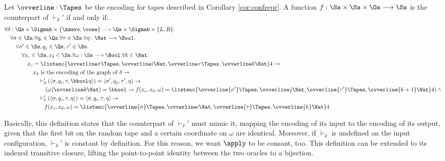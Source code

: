 \begin{conditional}{\notappendix}
  \begin{defn}
    \label{def:vdashcounter}
    Let $\ovverline \cdot \Tapes$ be the encoding for tapes described in
    Corollary \ref{cor:confrepr}.
    A function $f : \Ss\times \Ss \times \Os \longrightarrow \Ss$ is the counterpart
    of $\vdash_\delta'$ if and only if:
    \begin{align*}
      &\forall \delta: \Qs \times \Sigmab \times \{\zzero, \oone\} \longrightarrow \Qs \times \Sigmab \times \{L,R\}. \\
      &\quad\forall \sigma \in \Ss.\forall q_i \in \Qs.\forall\tau \in \Ss.\forall \eta: \Nat\longrightarrow\Bool .\\
      &\quad\quad  \forall \sigma' \in \Ss, q_j\in \Qs,\tau'\in \Ss.\\
      &\quad\quad\quad  \forall x_c \in \Ss, x_\delta \in \Ss.\forall\omega: \Ss\longrightarrow\Bool. \forall k \in \Nat. \\
      &\quad\quad\quad\quad  x_c = \listenc {\ovverline \sigma \Tapes, \ovverline i \Nat, \ovverline \tau \Tapes, \ovverline k \Nat} 4 \to\\
      &\quad\quad\quad\quad\quad  x_\delta \text{ is the encoding of the graph of }\delta  \to\\
      &\quad\quad\quad\quad\quad\quad \vdash_\delta'(\langle \sigma, q_i, \tau, \bbool\eta\rangle)
      = \langle \sigma', q_j, \tau', \eta\rangle \to\\
      &\quad\quad\quad\quad\quad\quad\quad \left(\omega(\ovverline k \Nat)=\bbool \to
      f(x_c, x_\delta, \omega) = \listenc {\ovverline {\sigma'}\Tapes,
      \ovverline j \Nat, \ovverline {\tau'}\Tapes, \ovverline {k+1}\Nat} 4\right)\land\\
      &\quad\quad\quad\quad\quad\quad \vdash_\delta'(\langle \sigma, q_i, \tau, \eta\rangle)
      = \langle \sigma, q_i, \tau, \eta\rangle \to\\
      &\quad\quad\quad\quad\quad\quad\quad
      f(x_c, x_\delta, \omega) = \listenc {\ovverline {\sigma}\Tapes,
      \ovverline i \Nat, \ovverline {\tau}\Tapes, \ovverline {k}\Nat} 4\\
    \end{align*}
  \end{defn}

  Basically, this definition states that the counterpart of $\vdash_\delta'$
  must mimic it, mapping the encoding of its input to the encoding of its output,
  given that the first bit on the random tape and a certain coordinate on
  $\omega$ are identical.
  Moreover, if $\vdash_\delta$ is undefined on the input configuration, $\vdash_\delta'$
  is constant by definition. For this reason, we want $\apply$ to be consant, too.
  This definition can be extended to its indexed transitive closure,
  lifting the point-to-point identity between the two oracles to a bijection.


\end{conditional}
